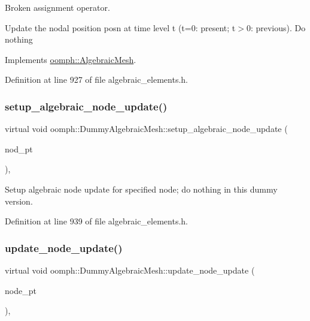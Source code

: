 Broken assignment operator. 

Update the nodal position posn at time level t (t=0\+: present; t$>$0\+: previous). Do nothing 

Implements \hyperlink{classoomph_1_1AlgebraicMesh_ab01d6f93354f3c4e5c9d1f0a5885a65b}{oomph\+::\+Algebraic\+Mesh}.



Definition at line 927 of file algebraic\+\_\+elements.\+h.

\mbox{\label{classoomph_1_1DummyAlgebraicMesh_a6c325393401f636979ea1a0079503f03}} 
\subsubsection{\texorpdfstring{setup\+\_\+algebraic\+\_\+node\+\_\+update()}{setup\_algebraic\_node\_update()}}
{\footnotesize\ttfamily virtual void oomph\+::\+Dummy\+Algebraic\+Mesh\+::setup\+\_\+algebraic\+\_\+node\+\_\+update (\begin{DoxyParamCaption}\item[{\hyperlink{classoomph_1_1AlgebraicNode}{Algebraic\+Node} $\ast$\&}]{nod\+\_\+pt }\end{DoxyParamCaption})\hspace{0.3cm}{\ttfamily [inline]}, {\ttfamily [virtual]}}



Setup algebraic node update for specified node; do nothing in this dummy version. 



Definition at line 939 of file algebraic\+\_\+elements.\+h.

\mbox{\label{classoomph_1_1DummyAlgebraicMesh_a8797e6bf088b172b5d7e1de8a2dfc326}} 
\subsubsection{\texorpdfstring{update\+\_\+node\+\_\+update()}{update\_node\_update()}}
{\footnotesize\ttfamily virtual void oomph\+::\+Dummy\+Algebraic\+Mesh\+::update\+\_\+node\+\_\+update (\begin{DoxyParamCaption}\item[{\hyperlink{classoomph_1_1AlgebraicNode}{Algebraic\+Node} $\ast$\&}]{node\+\_\+pt }\end{DoxyParamCaption})\hspace{0.3cm}{\ttfamily [inline]}, {\ttfamily [virtual]}}



